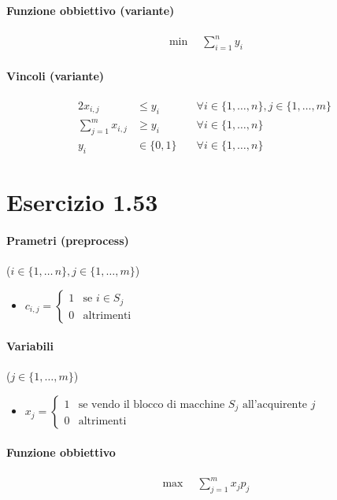 \documentclass{article}
\begin{document}
\paragraph{Funzione obbiettivo (variante)}
\begin{align*}
  \min \quad \sum_{i=1}^n y_i
\end{align*}

\paragraph{Vincoli (variante)}
\begin{alignat}{2}
  x_{i,j} &\leq y_i &\forall i \in \{1,\ldots,n\}, j \in \{1,\ldots,m\}\\
  \sum_{j=1}^m x_{i,j} &\geq y_i &\forall i \in \{1,\ldots,n\}\\
  y_i &\in \{0,1\} \quad &\forall i \in \{1,\ldots,n\}
\end{alignat}

\pagebreak
\section{Esercizio 1.53}

\paragraph{Prametri (preprocess)} ($i \in \{1,\ldots\,n\}, j \in \{1,\ldots,m\}$)
\begin{itemize}
  \item $c_{i,j} = \begin{cases}
      1 & \text{se }i \in S_j \\
      0 & \text{altrimenti}
  \end{cases}$
\end{itemize}

\paragraph{Variabili} ($j \in \{1,\ldots,m\}$)
\begin{itemize}
  \item $x_j = \begin{cases}
    1 &\text{se vendo il blocco di macchine }S_j\text{ all'acquirente }j\\
    0 &\text{altrimenti}
  \end{cases}$
\end{itemize}

\paragraph{Funzione obbiettivo}
\begin{align*}
  \max \quad \sum_{j=1}^m x_j p_j
\end{align*}
\end{document}
